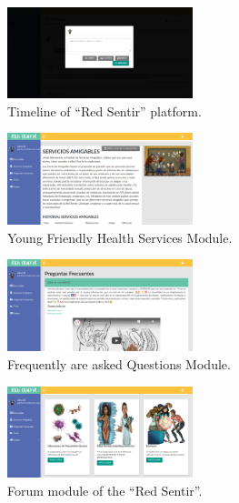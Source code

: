 \documentclass[journal,transmag]{IEEEtran}
\begin{document}
\begin{figure}[tbp]
\centering
\includegraphics[width=0.48\textwidth]{novedades.png}
\caption{Timeline of ``Red Sentir'' platform.}
\label{fig:novedades}
\end{figure}

\begin{figure}[tbp]
\centering
\includegraphics[width=0.48\textwidth]{SA.png}
\caption{Young Friendly Health Services Module.}
\label{fig:SA}
\end{figure}

\begin{figure}[tbp]
\centering
\includegraphics[width=0.48\textwidth]{FAQ.png}
\caption{Frequently are asked Questions Module.}
\label{fig:FAQ}
\end{figure}

\begin{figure}[tbp]
\centering
\includegraphics[width=0.48\textwidth]{foros.png}
\caption{Forum module of the ``Red Sentir''.}
\label{fig:foros}
\end{figure}
\end{document}
